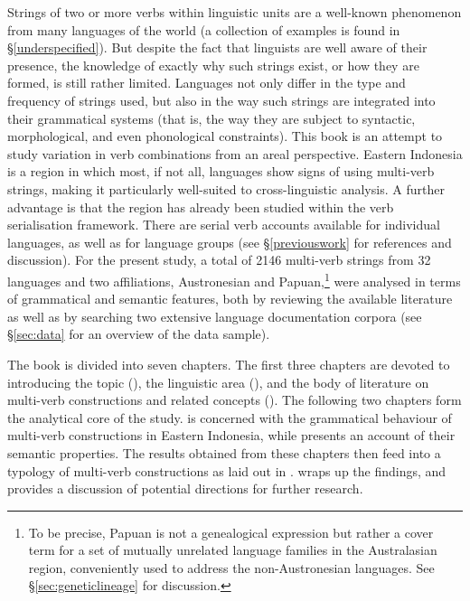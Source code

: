 Strings of two or more verbs within linguistic units are a well-known phenomenon from many languages of the world (a collection of examples is found in §\ref{underspecified}). But despite the fact that linguists are well aware of their presence, the knowledge of exactly why such strings exist, or how they are formed, is still rather limited. Languages not only differ in the type and frequency of strings used, but also in the way such strings are integrated into their grammatical systems (that is, the way they are subject to syntactic, morphological, and even phonological constraints). This book is an attempt to study variation in verb combinations from an areal perspective. Eastern Indonesia is a region in which most, if not all, languages show signs of using multi-verb strings, making it particularly well-suited to cross-linguistic analysis. A further advantage is that the region has already been studied within the verb serialisation framework. There are serial verb accounts available for individual languages, as well as for language groups (see §\ref{previouswork} for references and discussion). For the present study, a total of 2146 multi-verb strings from 32 languages and two affiliations, Austronesian and Papuan,\footnote{To be precise, Papuan is not a genealogical expression but rather a cover term for a set of mutually unrelated language families in the Australasian region, conveniently used to address the non-Austronesian languages. See §\ref{sec:geneticlineage} for discussion.} were analysed in terms of grammatical and semantic features, both by reviewing the available literature as well as by searching two extensive language documentation corpora (see §\ref{sec:data} for an overview of the data sample).

The book is divided into seven chapters. The first three chapters are devoted to introducing the topic (), the linguistic area (), and the body of literature on multi-verb constructions and related concepts (). The following two chapters form the analytical core of the study.  is concerned with the grammatical behaviour of multi-verb constructions in Eastern Indonesia, while  presents an account of their semantic properties. The results obtained from these chapters then feed into a typology of multi-verb constructions as laid out in .  wraps up the findings, and provides a discussion of potential directions for further research. 

